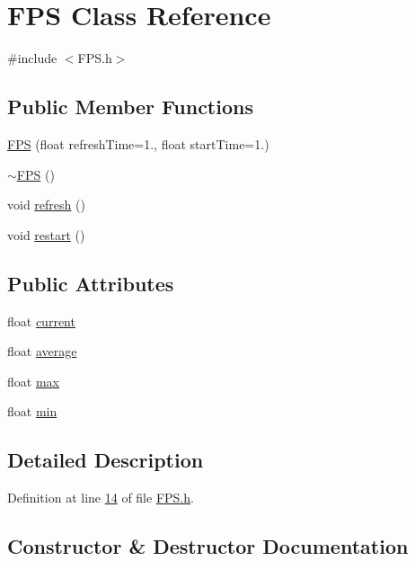 \hypertarget{class_f_p_s}{}\section{F\+P\+S Class Reference}
\label{class_f_p_s}


{\ttfamily \#include $<$F\+P\+S.\+h$>$}

\subsection*{Public Member Functions}
\begin{DoxyCompactItemize}
\item 
\hyperlink{class_f_p_s_aa7155cdb7ab1a351ae797f5c137dc39c}{F\+P\+S} (float refresh\+Time=1., float start\+Time=1.)
\item 
\hyperlink{class_f_p_s_ae9c26e732f0773feaacd6c812db04e88}{$\sim$\+F\+P\+S} ()
\item 
void \hyperlink{class_f_p_s_aa143312d7f24775fc5d829efa3878c83}{refresh} ()
\item 
void \hyperlink{class_f_p_s_a2804b8d6ff6f3670bc25fbbc53f5e689}{restart} ()
\end{DoxyCompactItemize}
\subsection*{Public Attributes}
\begin{DoxyCompactItemize}
\item 
float \hyperlink{class_f_p_s_ada217de2ec2b66f8485fdbf70ee33675}{current}
\item 
float \hyperlink{class_f_p_s_a5724af794ec15040b8b101dd0c547893}{average}
\item 
float \hyperlink{class_f_p_s_afdca12a152cef9df305e78d8d05ce518}{max}
\item 
float \hyperlink{class_f_p_s_af873eaf0d65931baa5f58415f024ccf7}{min}
\end{DoxyCompactItemize}


\subsection{Detailed Description}


Definition at line \hyperlink{_f_p_s_8h_source_l00014}{14} of file \hyperlink{_f_p_s_8h_source}{F\+P\+S.\+h}.



\subsection{Constructor \& Destructor Documentation}
\hypertarget{class_f_p_s_aa7155cdb7ab1a351ae797f5c137dc39c}{}
